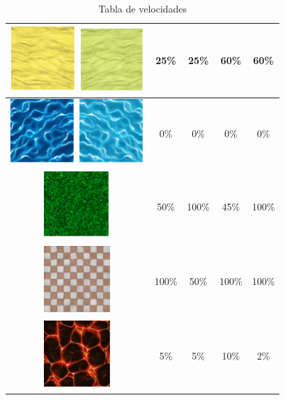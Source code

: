 \begin{table}[H]
\begin{tabular}{|c|c|c|c|c|}
        \hline
        \includegraphics{imagesTable/arena} \includegraphics{imagesTable/claroArena} & 25\% & 25\% & 60\% & 60\% \\
        \hline
        \includegraphics{imagesTable/agua} \includegraphics{imagesTable/claroAgua} & 0\% & 0\% & 0\% & 0\% \\
        \hline
        \includegraphics{imagesTable/hierba} & 50\% & 100\% & 45\% & 100\% \\
        \hline
        \includegraphics[scale=0.33]{imagesTable/suelo} & 100\% & 50\% & 100\% & 100\% \\
        \hline
        \includegraphics{imagesTable/lava} & 5\% & 5\% & 10\% & 2\% \\
        \hline
    \end{tabular}
    \caption{Tabla de velocidades}
    \label{tab:velocities}
\end{table}


